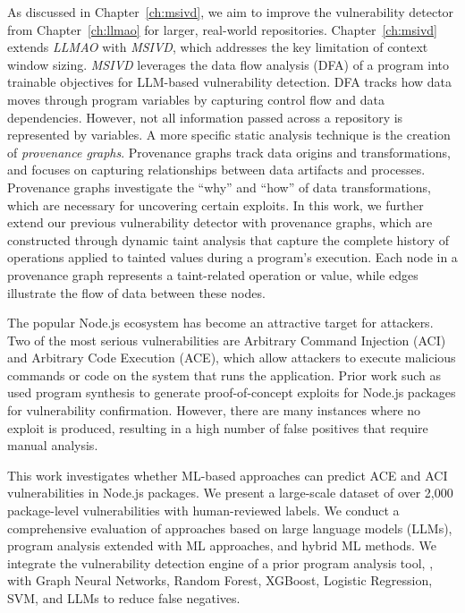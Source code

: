 \documentclass[12pt,openany,oneside,table]{cmuthesis}
\begin{document}
As discussed in Chapter~\ref{ch:msivd}, we aim to improve the vulnerability detector from Chapter~\ref{ch:llmao} for larger, real-world repositories. Chapter~\ref{ch:msivd} extends \textit{LLMAO} with \textit{MSIVD}, which addresses the key limitation of context window sizing. \textit{MSIVD} leverages the data flow analysis (DFA) of a program into trainable objectives for LLM-based vulnerability detection. DFA tracks how data moves through program variables by capturing control flow and data dependencies. However, not all information passed across a repository is represented by variables. A more specific static analysis technique is the creation of \textit{provenance graphs}. Provenance graphs track data origins and transformations, and focuses on capturing relationships between data artifacts and processes. Provenance graphs investigate the ``why'' and ``how'' of data transformations, which are necessary for uncovering certain exploits. In this work, we further extend our previous vulnerability detector with provenance graphs, which are constructed through dynamic taint analysis that capture the
complete history of operations applied to tainted values during a program’s execution. Each node in a provenance graph represents a taint-related operation or value, while edges illustrate the flow of data between these nodes.

The popular Node.js ecosystem has become an attractive target for attackers. Two of the most serious vulnerabilities are Arbitrary Command Injection (ACI) and Arbitrary Code Execution (ACE), which allow attackers to execute malicious commands or code on the system that runs the application. Prior work such as \nodemedicfine used program synthesis to generate proof-of-concept exploits for Node.js packages for vulnerability confirmation. However, there are many instances where no exploit is produced, resulting in a high number of false positives that require manual analysis. 

This work investigates whether ML-based approaches can predict ACE and ACI vulnerabilities in Node.js packages. We present a large-scale dataset of over 2,000 package-level vulnerabilities with human-reviewed labels. We conduct a comprehensive evaluation of approaches based on large language models (LLMs), program analysis extended with ML approaches, and hybrid ML methods.
We integrate the vulnerability detection engine of a prior program analysis tool, \nodemedic, with Graph Neural Networks, Random Forest, XGBoost, Logistic Regression, SVM, and LLMs to reduce false negatives.
\end{document}
